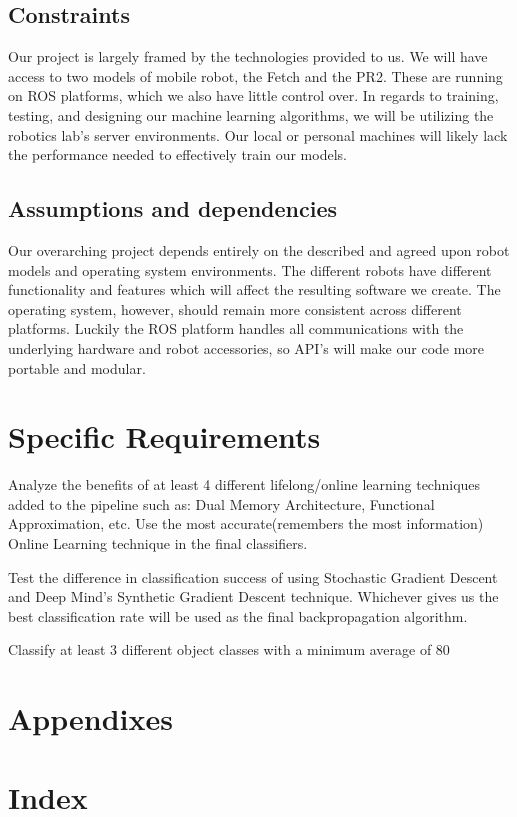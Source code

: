 \documentclass[a4paper, 10pt]{article}
\begin{document}
\subsection{Constraints}
Our project is largely framed by the technologies provided to us. We will have access to two models of mobile robot, the Fetch and the PR2. These are running on ROS platforms, which we also have little control over. In regards to training, testing, and designing our machine learning algorithms, we will be utilizing the robotics lab's server environments. Our local or personal machines will likely lack the performance needed to effectively train our models.   

\subsection{Assumptions and dependencies}
Our overarching project depends entirely on the described and agreed upon robot models and operating system environments. The different robots have different functionality and features which will affect the resulting software we create. The operating system, however, should remain more consistent across different platforms. Luckily the ROS platform handles all communications with the underlying hardware and robot accessories, so API's will make our code more portable and modular. 

\section{Specific Requirements}
Analyze the benefits of at least 4 different lifelong/online learning techniques added to the pipeline such as: Dual Memory Architecture, Functional Approximation, etc. Use the most accurate(remembers the most information) Online Learning technique in the final classifiers.

Test the difference in classification success of using Stochastic Gradient Descent and Deep Mind's Synthetic Gradient Descent technique. Whichever gives us the best classification rate will be used as the final backpropagation algorithm.
	
Classify at least 3 different object classes with a minimum average of 80%
\section{Appendixes}

\section{Index}



\end{document}
